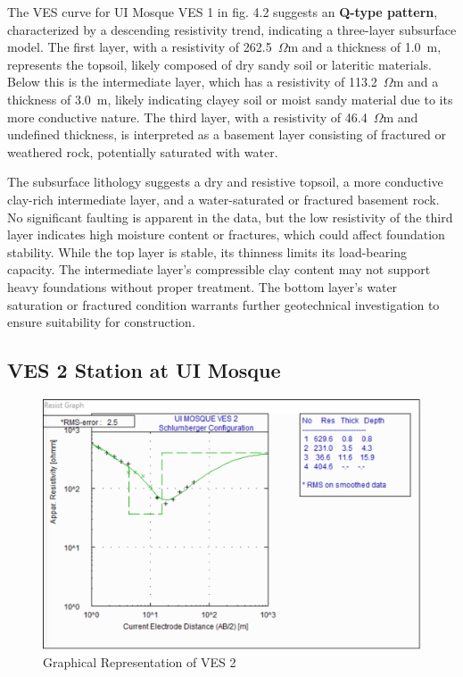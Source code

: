\documentclass[12pt,a4paper]{report}
\begin{document}
The VES curve for UI Mosque VES 1 in fig. 4.2 suggests an \textbf{Q-type pattern}, characterized by a descending resistivity trend, indicating a three-layer subsurface model. The first layer, with a resistivity of 262.5~$\Omega$m and a thickness of 1.0~m, represents the topsoil, likely composed of dry sandy soil or lateritic materials. Below this is the intermediate layer, which has a resistivity of 113.2~$\Omega$m and a thickness of 3.0~m, likely indicating clayey soil or moist sandy material due to its more conductive nature. The third layer, with a resistivity of 46.4~$\Omega$m and undefined thickness, is interpreted as a basement layer consisting of fractured or weathered rock, potentially saturated with water.

The subsurface lithology suggests a dry and resistive topsoil, a more conductive clay-rich intermediate layer, and a water-saturated or fractured basement rock. No significant faulting is apparent in the data, but the low resistivity of the third layer indicates high moisture content or fractures, which could affect foundation stability. While the top layer is stable, its thinness limits its load-bearing capacity. The intermediate layer’s compressible clay content may not support heavy foundations without proper treatment. The bottom layer’s water saturation or fractured condition warrants further geotechnical investigation to ensure suitability for construction.

\subsection{VES 2 Station at UI Mosque}

\begin{figure}[H]
    \centering
    \includegraphics[width=1.0\textwidth]{ui_ves2.png}
    \caption{Graphical Representation of VES 2}
    \label{fig:VES_2_Curve}
\end{figure}
\end{document}

